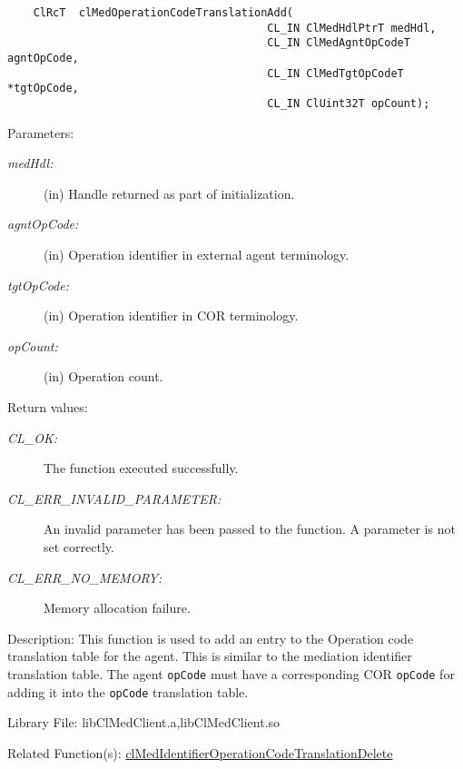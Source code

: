 \begin{flushleft}
\begin{Desc}
\footnotesize\begin{verbatim}    ClRcT  clMedOperationCodeTranslationAdd(
                                  		CL_IN ClMedHdlPtrT medHdl,
                                  		CL_IN ClMedAgntOpCodeT agntOpCode,
                                  		CL_IN ClMedTgtOpCodeT *tgtOpCode,
                                  		CL_IN ClUint32T opCount);
\end{verbatim}
\normalsize
\end{Desc}
\begin{Desc}
\item[Parameters:]
\begin{description}
\item[{\em med\-Hdl:}](in) Handle returned as part of initialization. 
\item[{\em agnt\-Op\-Code:}](in) Operation identifier in external agent terminology.
\item[{\em tgt\-Op\-Code:}](in) Operation identifier in COR terminology. 
\item[{\em op\-Count:}](in) Operation count.\end{description}
\end{Desc}
\begin{Desc}
\item[Return values:]
\begin{description}
\item[{\em CL\_\-OK:}]The function executed successfully. 
\item[{\em CL\_\-ERR\_\-INVALID\_\-PARAMETER:}]An invalid parameter has been passed to the function. A parameter is not set correctly. 
\item[{\em CL\_\-ERR\_\-NO\_\-MEMORY:}]Memory allocation failure.\end{description}
\end{Desc}
\begin{Desc}
\item[Description:]This function is used to add an entry to the Operation code translation table for the agent. This is similar to the mediation 
identifier translation table. The agent {\tt{op\-Code}} must have a corresponding COR {\tt{op\-Code}} for adding it into the {\tt{op\-Code}} 
translation table.\end{Desc}
\begin{Desc}
\item[Library File:]lib\-Cl\-Med\-Client.a,lib\-Cl\-Med\-Client.so\end{Desc}
\begin{Desc}
\item[Related Function(s):]\hyperlink{pagemed107}{cl\-Med\-Identifier\-Operation\-Code\-Translation\-Delete}\end{Desc}
\newpage



\end{flushleft}
